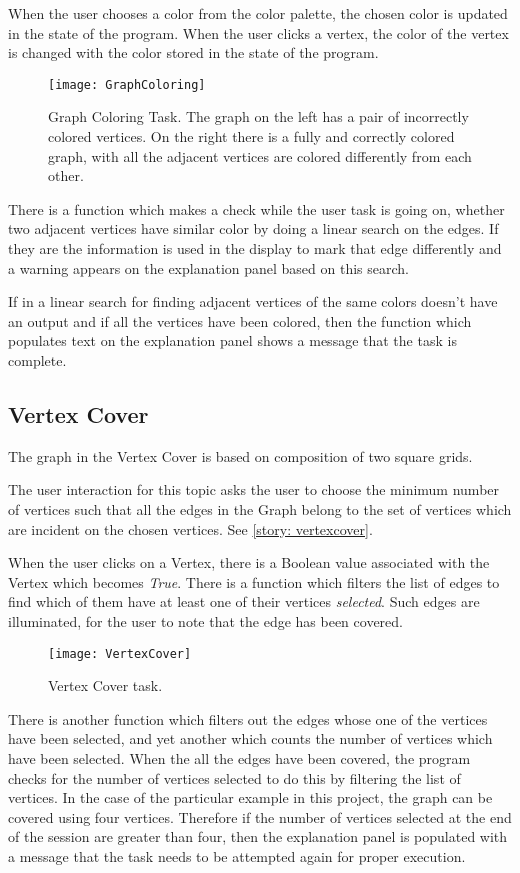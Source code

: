 When the user chooses a color from the color palette, the chosen color is
updated in the state of the program. When the user clicks a vertex, the color
of the vertex is changed with the color stored in the state of the program.

\begin{figure}[h]
\centering
\texttt{[image: GraphColoring]}
\caption{
        Graph Coloring Task. The graph on the left has a pair of incorrectly
        colored vertices. On the right there is a fully and correctly colored
        graph, with all the adjacent vertices are colored differently from each
        other.
        }
\label{animationfigure: max3cut}
\end{figure}

There is a function which makes a check while the user task is going on, whether
two adjacent vertices have similar color by doing a linear search on the edges.
If they are the information is used in the display to mark that edge differently
and a warning appears on the explanation panel based on this search.

If in a linear search for finding adjacent vertices of the same colors
doesn't have an output and if all the vertices have been colored, then
the function which populates text on the explanation panel shows a message that
the task is complete.

\subsection{Vertex Cover}

The graph in the Vertex Cover is based on composition of two square grids.

The user interaction for this topic asks the user to choose the minimum number
of vertices such that all the edges in the Graph belong to the set of vertices
which are incident on the chosen vertices. See \autoref{story: vertexcover}.

When the user clicks on a Vertex, there is a Boolean value associated with the
Vertex which becomes \emph{True}. There is a function which filters
the list of edges to find which of them have at least one of their vertices
\emph{selected}. Such edges are illuminated, for the user to note that the edge has
been covered.

\begin{figure}[ht]
\centering
\texttt{[image: VertexCover]}
\caption{
        Vertex Cover task.
        }
\label{animationfigure: vertexCover}
\end{figure}
There is another function which filters out the edges whose one of the vertices
have been selected, and yet another which counts the number of vertices which
have been selected.  When the all the edges have been covered, the program
checks for the number of vertices selected to do this by filtering the list of
vertices. In the case of the particular example in this project, the graph can
be covered using four vertices. Therefore if the number of vertices selected at
the end of the session are greater than four, then the explanation panel is
populated with a message that the task needs to be attempted again for proper
execution.

